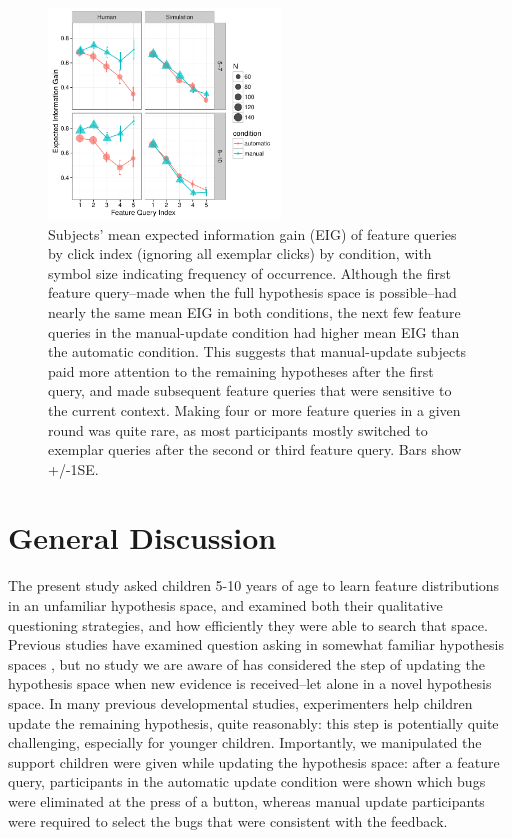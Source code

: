 \documentclass[man,floatsintext]{apa6}
\begin{document}
 \begin{figure}[!h]
 \centering
  \includegraphics[width=0.55\textwidth]{figures/info_gain_by_click_n_age_w_sims} %
  \caption{Subjects' mean expected information gain (EIG) of feature queries by click index (ignoring all exemplar clicks) by condition, with symbol size indicating frequency of occurrence. Although the first feature query--made when the full hypothesis space is possible--had nearly the same mean EIG in both conditions, the next few feature queries in the manual-update condition had higher mean EIG than the automatic condition. This suggests that manual-update subjects paid more attention to the remaining hypotheses after the first query, and made subsequent feature queries that were sensitive to the current context. Making four or more feature queries in a given round was quite rare, as most participants mostly switched to exemplar queries after the second or third feature query. Bars show +/-1SE.}
  \label{fig:EIG_by_click}
 \end{figure} 


\section{General Discussion}

The present study asked children 5-10 years of age to learn feature distributions in an unfamiliar hypothesis space, and examined both their qualitative questioning strategies, and how efficiently they were able to search that space. Previous studies have examined question asking in somewhat familiar hypothesis spaces \cite{Herwig:1982,Mosher:1966,Nelson:2014,Ruggeri:2014,Ruggeri:2015}, but no study we are aware of has considered the step of updating the hypothesis space when new evidence is received--let alone in a novel hypothesis space. In many previous developmental studies, experimenters help children update the remaining hypothesis, quite reasonably: this step is potentially quite challenging, especially for younger children.  Importantly, we manipulated the support children were  given while updating the hypothesis space: after a feature query, participants in the 
automatic update condition were shown which bugs were eliminated at the press of 
a button, whereas manual update participants were required to select the bugs that 
were consistent with the feedback. 
\end{document}
